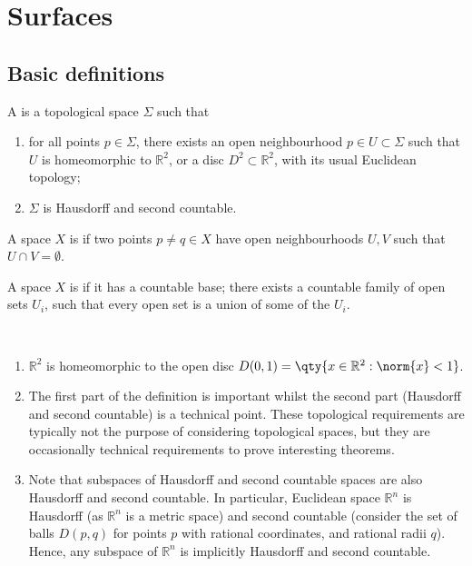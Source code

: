 \section{Surfaces}

\subsection{Basic definitions}
\begin{definition}
	A  is a topological space $\Sigma$ such that
	\begin{enumerate}
		\item for all points $p \in \Sigma$, there exists an open neighbourhood $p \in U \subset \Sigma$ such that $U$ is homeomorphic to $\mathbb R^2$, or a disc $D^2 \subset \mathbb R^2$, with its usual Euclidean topology;
		\item $\Sigma$ is Hausdorff and second countable.
	\end{enumerate}
\end{definition}

\begin{definition}[Hausdorff]
	A space $X$ is  if two points $p \neq q \in X$ have open neighbourhoods $U, V$ such that $U \cap V = \emptyset$.
\end{definition} 

\begin{definition}
	A space $X$ is  if it has a countable base; there exists a countable family of open sets $U_i$, such that every open set is a union of some of the $U_i$.
\end{definition} 

\begin{remark} \
	\begin{enumerate}
		\item $\mathbb R^2$ is homeomorphic to the open disc $D(0,1) = \qty{ x \in \mathbb R^2 : \norm{x} < 1 }$.
		\item The first part of the definition is important whilst the second part (Hausdorff and second countable) is a technical point. 
		These topological requirements are typically not the purpose of considering topological spaces, but they are occasionally technical requirements to prove interesting theorems.
		\item 	Note that subspaces of Hausdorff and second countable spaces are also Hausdorff and second countable.	
		In particular, Euclidean space $\mathbb R^n$ is Hausdorff (as $\mathbb R^n$ is a metric space) and second countable (consider the set of balls $D(p,q)$ for points $p$ with rational coordinates, and rational radii $q$).
		Hence, any subspace of $\mathbb R^n$ is implicitly Hausdorff and second countable.
	\end{enumerate} 
\end{remark}

